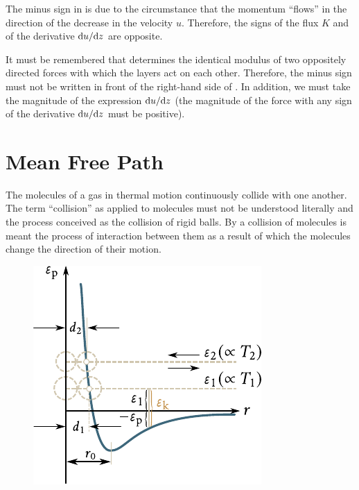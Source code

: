 The minus sign in  is due to the circumstance that the momentum ``flows'' in the direction of the decrease in the velocity $u$. Therefore, the signs of the flux $K$ and of the derivative $\mathrm{d} u/\mathrm{d} z$ are opposite.

It must be remembered that  determines the identical modulus of two oppositely directed forces with which the layers act on each other. Therefore, the minus sign must not be written in front of the right-hand side of . In addition, we must take the magnitude of the expression $\mathrm{d} u/\mathrm{d} z$ (the magnitude of the force with any sign of the derivative $\mathrm{d} u/\mathrm{d} z$ must be positive).

\section{Mean Free Path}\label{sec:16_2}

The molecules of a gas in thermal motion continuously collide with one another. The term ``collision'' as applied to molecules must not be understood literally and the process conceived as the collision of rigid balls. By a collision of molecules is meant the process of interaction
between them as a result of which the molecules change the direction of their motion.

\begin{figure}[t]
	\begin{center}
		\includegraphics[scale=1]{figures/ch_16/fig_16_3.pdf}
		\caption[]{}
		\label{fig:16_3}
	\end{center}
	\vspace{-0.8cm}
\end{figure}


